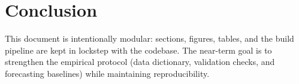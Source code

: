 \section{Conclusion}

This document is intentionally modular: sections, figures, tables, and the build pipeline are kept in lockstep with the codebase.
The near-term goal is to strengthen the empirical protocol (data dictionary, validation checks, and forecasting baselines) while maintaining reproducibility.

